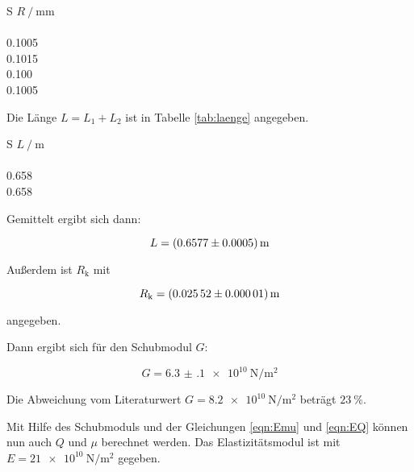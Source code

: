 \begin{table}[h]
  \centering
  \caption{Messwerte des Radius des Drahts.}
  \label{tab:raddraht}
  \begin{tabular}{S}
    \toprule
    {$R\:/\:\si{\milli\meter}$} \\
     \\
    0.1005 \\
    0.1015 \\
    0.100 \\
    0.1005 \\
    \bottomrule
  \end{tabular}
\end{table}

Die Länge $L = L_1 + L_2$ ist in Tabelle \ref{tab:laenge} angegeben.

\begin{table}[h]
  \centering
  \caption{Messwerte der Länge des Drahts.}
  \label{tab:laenge}
  \begin{tabular}{S}
    \toprule
    {$L\:/\:\si{\meter}$} \\
     \\
    0.658 \\
    0.658 \\
    \bottomrule
  \end{tabular}
\end{table}

Gemittelt ergibt sich dann:

\begin{equation*}
  L = \SI{0.6577 +- 0.0005}{\meter}
\end{equation*}

Außerdem ist $R_{\text{k}}$ mit

\begin{equation*}
  R_{\text{k}} = \SI{0.02552 +- 0.00001}{\meter}
\end{equation*}

angegeben.

Dann ergibt sich für den Schubmodul $G$:

\begin{equation*}
  G = \SI{6.3(1)e10}{\newton\per\meter\squared}
\end{equation*}

Die Abweichung vom Literaturwert $G = \SI{8.2e10}{\newton\per\meter\squared}$
beträgt $\SI{23}{\percent}$.

Mit Hilfe des Schubmoduls und der Gleichungen \eqref{eqn:Emu} und
\eqref{eqn:EQ}
können nun auch $Q$ und $\mu$ berechnet werden. Das Elastizitätsmodul ist mit
$E = \SI{21e10}{\newton\per\meter\squared}$ gegeben.

